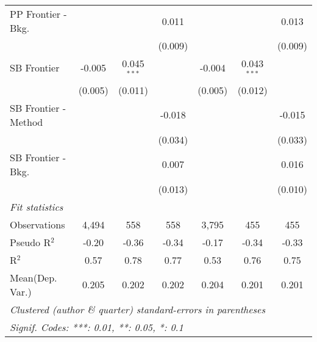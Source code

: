 \begin{tabular}{lcccccc}
   PP Frontier - Bkg.   &               &               & 0.011       &               &               & 0.013\\   
                        &               &               & (0.009)     &               &               & (0.009)\\   
   SB Frontier          & -0.005        & 0.045$^{***}$ &             & -0.004        & 0.043$^{***}$ &   \\   
                        & (0.005)       & (0.011)       &             & (0.005)       & (0.012)       &   \\   
   SB Frontier - Method &               &               & -0.018      &               &               & -0.015\\   
                        &               &               & (0.034)     &               &               & (0.033)\\   
   SB Frontier - Bkg.   &               &               & 0.007       &               &               & 0.016\\   
                        &               &               & (0.013)     &               &               & (0.010)\\   
   \midrule
   \emph{Fit statistics}\\
   Observations         & 4,494         & 558           & 558         & 3,795         & 455           & 455\\  
   Pseudo R$^2$         & -0.20         & -0.36         & -0.34       & -0.17         & -0.34         & -0.33\\  
   R$^2$                & 0.57          & 0.78          & 0.77        & 0.53          & 0.76          & 0.75\\  
Mean(Dep. Var.) & 0.205 & 0.202 & 0.202 & 0.204 & 0.201 & 0.201 \\
   \midrule \midrule
   \multicolumn{7}{l}{\emph{Clustered (author \& quarter) standard-errors in parentheses}}\\
   \multicolumn{7}{l}{\emph{Signif. Codes: ***: 0.01, **: 0.05, *: 0.1}}\\
\end{tabular}
\par\endgroup
